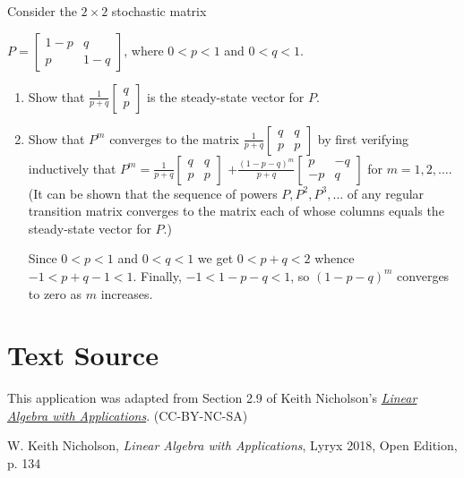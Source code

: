 \documentclass{ximera}
\begin{document}
\begin{problem}\label{prob:stochastic2}
Consider the $2 \times 2$ stochastic matrix

$P = \begin{bmatrix}
1 - p & q \\
p & 1 - q
\end{bmatrix}$, where $0 < p < 1$ and $0 < q < 1$.

\begin{enumerate}
\item Show that $\frac{1}{p + q} \begin{bmatrix}
q \\
p
\end{bmatrix}$
 is the steady-state vector for $P$.

\item Show that $P^{m}$ converges to the matrix $\frac{1}{p + q} \begin{bmatrix}
q & q \\
p & p
\end{bmatrix}$ by first verifying inductively that
$P^m = \frac{1}{p + q} \begin{bmatrix}
q & q \\
p & p
\end{bmatrix}$ $+ \frac{(1 - p - q)^m}{p + q} 
\begin{bmatrix}
p & -q \\
-p & q
\end{bmatrix}$ for $m = 1, 2, \dots$. (It can be shown that the sequence of powers $P, P^{2}, P^{3}, \dots$ of any regular transition matrix converges to the matrix each of whose columns equals the steady-state vector for $P$.)
\begin{hint}
Since $0 < p < 1$ and $0 < q < 1$ we get $0 < p + q < 2$ whence $-1 < p + q - 1 < 1$. Finally, $-1 < 1 - p - q < 1$, so $(1 - p - q)^{m}$ converges to zero as $m$ increases.
\end{hint}
\end{enumerate}
\end{problem}


\section*{Text Source} This application was adapted from Section 2.9 of Keith Nicholson's \href{https://open.umn.edu/opentextbooks/textbooks/linear-algebra-with-applications}{\it Linear Algebra with Applications}. (CC-BY-NC-SA)

W. Keith Nicholson, {\it Linear Algebra with Applications}, Lyryx 2018, Open Edition, p. 134 
\end{document}
